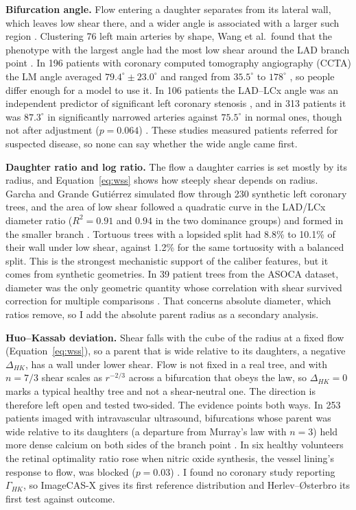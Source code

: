 \documentclass[11pt,a4paper]{article}
\begin{document}
\textbf{Bifurcation angle.} Flow entering a daughter separates from its lateral wall, which leaves low shear there, and a wider angle is associated with a larger such region \cite{murasato2022bifurcation}.
Clustering 76 left main arteries by shape, Wang et al.\ found that the phenotype with the largest angle had the most low shear around the LAD branch point \cite{wang2024lmphenotypes}.
In 196 patients with coronary computed tomography angiography (CCTA) the LM angle averaged $79.4^\circ \pm 23.0^\circ$ and ranged from $35.5^\circ$ to $178^\circ$ \cite{temov2016bifurcation}, so people differ enough for a model to use it.
In 106 patients the LAD--LCx angle was an independent predictor of significant left coronary stenosis \cite{cui2017bifurcation}, and in 313 patients it was $87.3^\circ$ in significantly narrowed arteries against $75.5^\circ$ in normal ones, though not after adjustment ($p = 0.064$) \cite{juan2017bifurcation}.
These studies measured patients referred for suspected disease, so none can say whether the wide angle came first.

\textbf{Daughter ratio and log ratio.} The flow a daughter carries is set mostly by its radius, and Equation~\ref{eq:wss} shows how steeply shear depends on radius.
Garcha and Grande Guti\'errez simulated flow through 230 synthetic left coronary trees, and the area of low shear followed a quadratic curve in the LAD/LCx diameter ratio ($R^2 = 0.91$ and $0.94$ in the two dominance groups) and formed in the smaller branch \cite{garcha2025sensitivity}.
Tortuous trees with a lopsided split had 8.8\% to 10.1\% of their wall under low shear, against 1.2\% for the same tortuosity with a balanced split.
This is the strongest mechanistic support of the caliber features, but it comes from synthetic geometries.
In 39 patient trees from the ASOCA dataset, diameter was the only geometric quantity whose correlation with shear survived correction for multiple comparisons \cite{shen2025helical}.
That concerns absolute diameter, which ratios remove, so I add the absolute parent radius as a secondary analysis.

\textbf{Huo--Kassab deviation.} Shear falls with the cube of the radius at a fixed flow (Equation~\ref{eq:wss}), so a parent that is wide relative to its daughters, a negative $\Delta_{HK}$, has a wall under lower shear.
Flow is not fixed in a real tree, and with $n = 7/3$ shear scales as $r^{-2/3}$ across a bifurcation that obeys the law, so $\Delta_{HK} = 0$ marks a typical healthy tree and not a shear-neutral one.
The direction is therefore left open and tested two-sided.
The evidence points both ways.
In 253 patients imaged with intravascular ultrasound, bifurcations whose parent was wide relative to its daughters (a departure from Murray's law with $n = 3$) held more dense calcium on both sides of the branch point \cite{schoenenberger2012murray}.
In six healthy volunteers the retinal optimality ratio rose when nitric oxide synthesis, the vessel lining's response to flow, was blocked ($p = 0.03$) \cite{witt2010optimality}.
I found no coronary study reporting $\Gamma_{HK}$, so ImageCAS-X gives its first reference distribution and Herlev--{\O}sterbro its first test against outcome.
\end{document}
